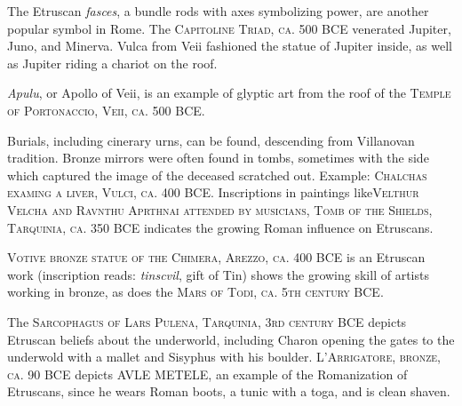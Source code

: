 \documentclass{article}
\begin{document}
The Etruscan \textit{fasces}, a bundle rods with axes symbolizing power, are another popular symbol in Rome.  The \textsc{Capitoline Triad, ca. 500 BCE} venerated Jupiter, Juno, and Minerva.  Vulca from Veii fashioned the statue of Jupiter inside, as well as Jupiter riding a chariot on the roof.

\textit{Apulu}, or Apollo of Veii, is an example of glyptic art from the roof of the \textsc{Temple of Portonaccio, Veii, ca. 500 BCE}.

Burials, including cinerary urns, can be found, descending from Villanovan tradition.  Bronze mirrors were often found in tombs, sometimes with the side which captured the image of the deceased scratched out.  Example: \textsc{Chalchas examing a liver, Vulci, ca. 400 BCE}.  Inscriptions in paintings like\textsc{Velthur Velcha and Ravnthu Aprthnai attended by musicians, Tomb of the Shields, Tarquinia, ca. 350 BCE} indicates the growing Roman influence on Etruscans.

\textsc{Votive bronze statue of the Chimera, Arezzo, ca. 400 BCE} is an Etruscan work (inscription reads: \textit{tinscvil}, gift of Tin) shows the growing skill of artists working in bronze, as does the \textsc{Mars of Todi, ca. 5th century BCE}.

The \textsc{Sarcophagus of Lars Pulena, Tarquinia, 3rd century BCE} depicts Etruscan beliefs about the underworld, including Charon opening the gates to the underwold with a mallet and Sisyphus with his boulder.  \textsc{L'Arrigatore, bronze, ca. 90 BCE} depicts AVLE METELE, an example of the Romanization of Etruscans, since he wears Roman boots, a tunic with a toga, and is clean shaven.
\end{document}
